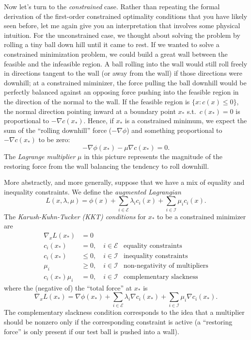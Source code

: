 \documentclass[12pt, leqno]{article} %
\begin{document}
Now let's turn to the {\em constrained} case.  Rather than repeating
the formal derivation of the first-order constrained optimality
conditions that you have likely seen before, let me again give you an
interpretation that involves some physical intuition.  For the
unconstrained case, we thought about solving the problem by rolling
a tiny ball down hill until it came to rest.  If we wanted to solve a
constrained minimization problem, we could build a great wall between
the feasible and the infeasible region.  A ball rolling into the wall
would still roll freely in directions tangent to the wall (or away
from the wall) if those directions were downhill; at a constrained
miminizer, the force pulling the ball downhill would be perfectly
balanced against an opposing force pushing into the feasible region
in the direction of the normal to the wall.  If the feasible region
is $\{x : c(x) \leq 0\}$, the normal direction pointing inward at a
boundary point $x_*$ s.t.~$c(x_*) = 0$ is proportional to
$-\nabla c(x_*)$.  Hence, if $x_*$ is a constrained minimum,
we expect the sum of the ``rolling downhill'' force ($-\nabla \phi$)
and something proportional to $-\nabla c(x_*)$ to be zero:
\[
  -\nabla \phi(x_*) - \mu \nabla c(x_*) = 0.
\]
The {\em Lagrange multiplier} $\mu$ in this picture represents the
magnitude of the restoring force from the wall balancing the tendency
to roll downhill.

More abstractly, and more generally, suppose that we have a mix of
equality and inequality constraints.  We define
the {\em augmented Lagrangian}
\[
  L(x, \lambda, \mu) = \phi(x) +
    \sum_{i \in \mathcal{E}} \lambda_i c_i(x) +
    \sum_{i \in \mathcal{I}} \mu_i c_i(x).
\]
The {\em Karush-Kuhn-Tucker (KKT) conditions} for $x_*$ to be a
constrained minimizer are
\begin{align*}
  \nabla_x L(x_*) &= 0 \\
  c_i(x_*) &= 0, \quad i \in \mathcal{E}
  & \mbox{equality constraints}\\
  c_i(x_*) & \leq 0, \quad i \in \mathcal{I}
  & \mbox{inequality constraints}\\
  \mu_i & \geq 0, \quad i \in \mathcal{I}
  & \mbox{non-negativity of multipliers}\\
  c_i(x_*) \mu_i &= 0, \quad i \in \mathcal{I}
  & \mbox{complementary slackness}
\end{align*}
where the (negative of) the ``total force'' at $x_*$ is
\[
  \nabla_x L(x_*) = \nabla \phi(x_*) +
    \sum_{i\in \mathcal{E}} \lambda_i \nabla c_i(x_*) +
    \sum_{i\in \mathcal{I}} \mu_i \nabla c_i(x_*).
\]
The complementary slackness condition corresponds to the idea that a
multiplier should be nonzero only if the corresponding constraint is
active (a ``restoring force'' is only present if our test ball
is pushed into a wall).
\end{document}
